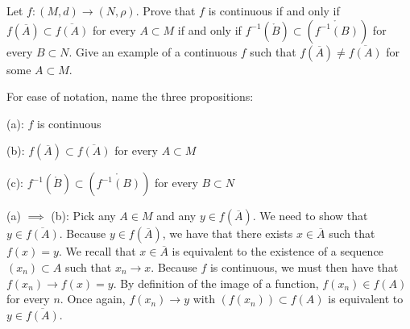 \begin{exercise}{30}
    Let $f: (M, d) \rightarrow (N, \rho)$.
    Prove that $f$ is continuous if and only if $f(\overline{A}) \subset \overline{f(A)}$ for every $A \subset M$ if and only if $f^{-1}(\mathring{B}) \subset (\mathring{f^{-1}(B)})$ for every $B \subset N$.
    Give an example of a continuous $f$ such that $f(\overline{A}) \neq \overline{f(A)}$ for some $A \subset M$.
\end{exercise}

\begin{solution}
    
    For ease of notation, name the three propositions:

    (a): $f$ is continuous

    (b): $f(\overline{A}) \subset \overline{f(A)}$ for every $A \subset M$

    (c): $f^{-1}(\mathring{B}) \subset (\mathring{f^{-1}(B)})$ for every $B \subset N$

    (a) $\implies$ (b): Pick any $A \in M$ and any $y \in f(\overline{A})$.
    We need to show that $y \in \overline{f(A)}$.
    Because $y \in f(\overline{A})$, we have that there exists $x \in \overline{A}$ such that $f(x) = y$.
    We recall that $x \in \overline{A}$ is equivalent to the existence of a sequence $(x_n) \subset A$ such that $x_n \rightarrow x$.
    Because $f$ is continuous, we must then have that $f(x_n) \rightarrow f(x) = y$.
    By definition of the image of a function, $f(x_n) \in f(A)$ for every $n$.
    Once again, $f(x_n) \rightarrow y$ with $(f(x_n)) \subset f(A)$ is equivalent to $y \in \overline{f(A)}$.


\end{solution}
